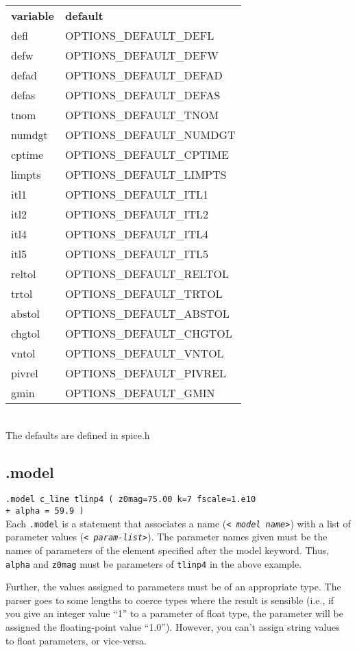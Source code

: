 \begin{tabular}{ll}
{\bf variable} & {\bf default} \\
defl	& OPTIONS\_DEFAULT\_DEFL \\
defw	& OPTIONS\_DEFAULT\_DEFW \\
defad	& OPTIONS\_DEFAULT\_DEFAD \\
defas	& OPTIONS\_DEFAULT\_DEFAS \\
tnom	& OPTIONS\_DEFAULT\_TNOM \\
numdgt	& OPTIONS\_DEFAULT\_NUMDGT \\
cptime	& OPTIONS\_DEFAULT\_CPTIME \\
limpts	& OPTIONS\_DEFAULT\_LIMPTS \\
itl1	& OPTIONS\_DEFAULT\_ITL1 \\
itl2	& OPTIONS\_DEFAULT\_ITL2 \\
itl4	& OPTIONS\_DEFAULT\_ITL4 \\
itl5	& OPTIONS\_DEFAULT\_ITL5 \\
reltol	& OPTIONS\_DEFAULT\_RELTOL \\
trtol	& OPTIONS\_DEFAULT\_TRTOL \\
abstol	& OPTIONS\_DEFAULT\_ABSTOL \\
chgtol	& OPTIONS\_DEFAULT\_CHGTOL \\
vntol	& OPTIONS\_DEFAULT\_VNTOL \\
pivrel	& OPTIONS\_DEFAULT\_PIVREL \\
gmin	& OPTIONS\_DEFAULT\_GMIN
\end{tabular}\\[0.2in]
The defaults are defined in spice.h


\subsection[.model]{.model}

{\tt .model c\_line tlinp4 ( z0mag=75.00 k=7 fscale=1.e10 \\
+ alpha = 59.9 )} \medskip \\ 
Each {\tt .model} is a statement that associates a name ({\tt <{\it
model name}>}) with a list of parameter values ({\tt <{\it
param-list}>}).  The parameter names given must be the names of
parameters of the element specified after the model keyword.  Thus,
{\tt alpha} and {\tt z0mag} must be parameters of {\tt tlinp4} in the
above example.

Further, the values assigned to parameters must be of an appropriate
type.  The parser goes to some lengths to coerce types where the
result is sensible (i.e., if you give an integer value ``1'' to a
parameter of float type, the parameter will be assigned the
floating-point value ``1.0'').  However, you can't assign string
values to float parameters, or vice-versa.

